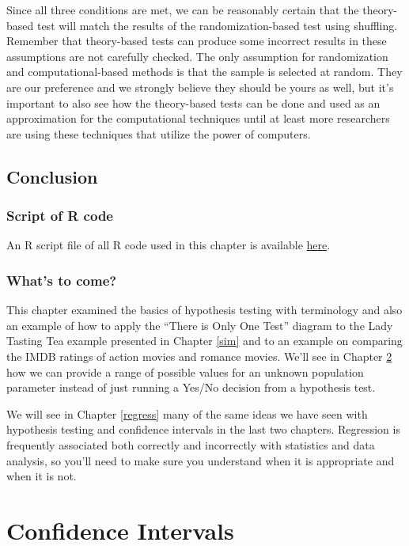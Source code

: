 \documentclass[]{tufte-book}
\theoremstyle{definition}
\theoremstyle{definition}
\theoremstyle{remark}
\begin{document}
Since all three conditions are met, we can be reasonably certain that
the theory-based test will match the results of the randomization-based
test using shuffling. Remember that theory-based tests can produce some
incorrect results in these assumptions are not carefully checked. The
only assumption for randomization and computational-based methods is
that the sample is selected at random. They are our preference and we
strongly believe they should be yours as well, but it's important to
also see how the theory-based tests can be done and used as an
approximation for the computational techniques until at least more
researchers are using these techniques that utilize the power of
computers.

\section{Conclusion}\label{conclusion-3}

\subsection{Script of R code}\label{script-of-r-code-3}

An R script file of all R code used in this chapter is available
\href{http://ismayc.github.io/moderndiver-book/scripts/07-hypo.R}{here}.

\subsection{What's to come?}\label{whats-to-come-4}

This chapter examined the basics of hypothesis testing with terminology
and also an example of how to apply the ``There is Only One Test''
diagram to the Lady Tasting Tea example presented in Chapter \ref{sim}
and to an example on comparing the IMDB ratings of action movies and
romance movies. We'll see in Chapter \ref{ci} how we can provide a range
of possible values for an unknown population parameter instead of just
running a Yes/No decision from a hypothesis test.

We will see in Chapter \ref{regress} many of the same ideas we have seen
with hypothesis testing and confidence intervals in the last two
chapters. Regression is frequently associated both correctly and
incorrectly with statistics and data analysis, so you'll need to make
sure you understand when it is appropriate and when it is not.

\chapter{Confidence Intervals}\label{ci}
\end{document}
